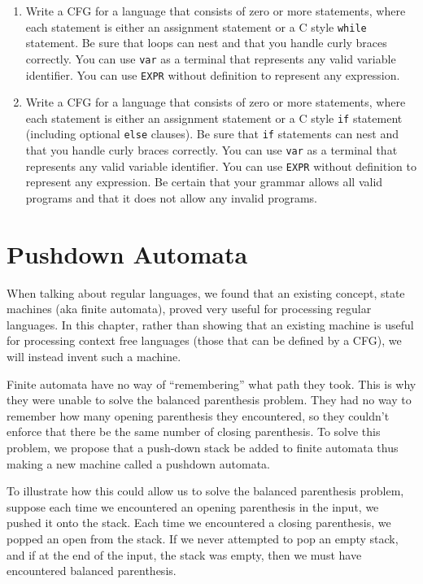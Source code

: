 \documentclass[letterpaper,12pt,openany,reqno]{book}%
\newcommand{\code}[1] {\lstinline[breaklines=yes,breakatwhitespace=yes]{#1}}
\begin{document}
\begin{enumerate}
\item Write a CFG for a language that consists of zero or more statements, where each statement is either an assignment statement or a C style \code{while} statement. Be sure that loops can nest and that you handle curly braces correctly. You can use \code{var} as a terminal that represents any valid variable identifier. You can use \code{EXPR} without definition to represent any expression.
\item Write a CFG for a language that consists of zero or more statements, where each statement is either an assignment statement or a C style \code{if} statement (including optional \code{else} clauses). Be sure that \code{if} statements can nest and that you handle curly braces correctly. You can use \code{var} as a terminal that represents any valid variable identifier. You can use \code{EXPR} without definition to represent any expression. Be certain that your grammar allows all valid programs and that it does not allow any invalid programs.

\end{enumerate}

\chapter{Pushdown Automata}
When talking about regular languages, we found that an existing concept, state machines (aka finite automata), proved very useful for processing regular languages. In this chapter, rather than showing that an existing machine is useful for processing context free languages (those that can be defined by a CFG), we will instead invent such a machine.

Finite automata have no way of ``remembering'' what path they took. This is why they were unable to solve the balanced parenthesis problem. They had no way to remember how many opening parenthesis they encountered, so they couldn't enforce that there be the same number of closing parenthesis. To solve this problem, we propose that a push-down stack be added to finite automata thus making a new machine called a pushdown automata.

To illustrate how this could allow us to solve the balanced parenthesis problem, suppose each time we encountered an opening parenthesis in the input, we pushed it onto the stack. Each time we encountered a closing parenthesis, we popped an open from the stack. If we never attempted to pop an empty stack, and if at the end of the input, the stack was empty, then we must have encountered balanced parenthesis.
\end{document}
